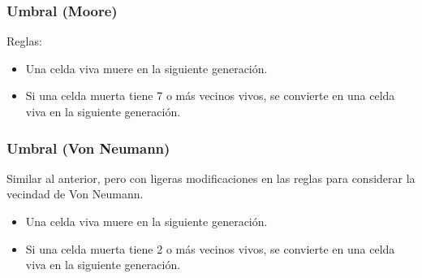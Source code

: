 \subsubsection{Umbral (Moore)}
Reglas:
\begin{itemize}
    \item Una celda viva muere en la siguiente generación.
    \item Si una celda muerta tiene 7 o más vecinos vivos, se convierte en una celda viva en la siguiente generación.
\end{itemize}

\subsubsection{Umbral (Von Neumann)}
Similar al anterior, pero con ligeras modificaciones en las reglas para considerar la vecindad de Von Neumann.
\begin{itemize}
    \item Una celda viva muere en la siguiente generación.
    \item Si una celda muerta tiene 2 o más vecinos vivos, se convierte en una celda viva en la siguiente generación.
\end{itemize}


